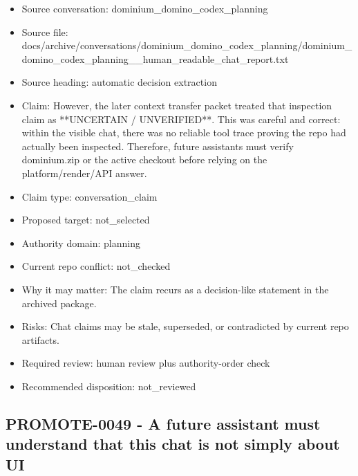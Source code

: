 \documentclass[11pt,a4paper]{report}
\begin{document}
\begin{itemize}
\item Source conversation: dominium\_domino\_codex\_planning
\item Source file: docs/archive/conversations/dominium\_domino\_codex\_planning/dominium\_domino\_codex\_planning\_\_human\_readable\_chat\_report.txt
\item Source heading: automatic decision extraction
\item Claim: However, the later context transfer packet treated that inspection claim as **UNCERTAIN / UNVERIFIED**. This was careful and correct: within the visible chat, there was no reliable tool trace proving the repo had actually been inspected. Therefore, future assistants must verify dominium.zip or the active checkout before relying on the platform/render/API answer.
\item Claim type: conversation\_claim
\item Proposed target: not\_selected
\item Authority domain: planning
\item Current repo conflict: not\_checked
\item Why it may matter: The claim recurs as a decision-like statement in the archived package.
\item Risks: Chat claims may be stale, superseded, or contradicted by current repo artifacts.
\item Required review: human review plus authority-order check
\item Recommended disposition: not\_reviewed
\end{itemize}

\subsection{PROMOTE-0049 - A future assistant must understand that this chat is not simply about UI}
\end{document}

